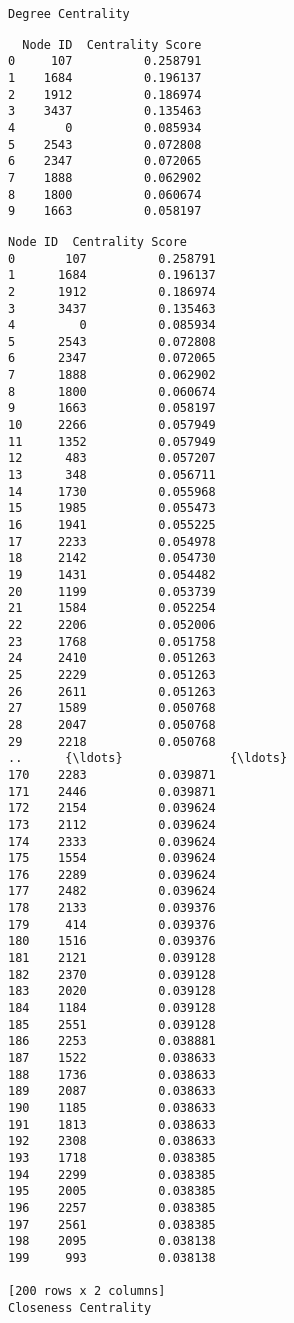 \documentclass[11pt]{article}
\begin{document}
    \begin{Verbatim}[commandchars=\\\{\}]
Degree Centrality

    \end{Verbatim}

    
    \begin{verbatim}
  Node ID  Centrality Score
0     107          0.258791
1    1684          0.196137
2    1912          0.186974
3    3437          0.135463
4       0          0.085934
5    2543          0.072808
6    2347          0.072065
7    1888          0.062902
8    1800          0.060674
9    1663          0.058197
    \end{verbatim}

    
    \begin{Verbatim}[commandchars=\\\{\}]
    Node ID  Centrality Score
0       107          0.258791
1      1684          0.196137
2      1912          0.186974
3      3437          0.135463
4         0          0.085934
5      2543          0.072808
6      2347          0.072065
7      1888          0.062902
8      1800          0.060674
9      1663          0.058197
10     2266          0.057949
11     1352          0.057949
12      483          0.057207
13      348          0.056711
14     1730          0.055968
15     1985          0.055473
16     1941          0.055225
17     2233          0.054978
18     2142          0.054730
19     1431          0.054482
20     1199          0.053739
21     1584          0.052254
22     2206          0.052006
23     1768          0.051758
24     2410          0.051263
25     2229          0.051263
26     2611          0.051263
27     1589          0.050768
28     2047          0.050768
29     2218          0.050768
..      {\ldots}               {\ldots}
170    2283          0.039871
171    2446          0.039871
172    2154          0.039624
173    2112          0.039624
174    2333          0.039624
175    1554          0.039624
176    2289          0.039624
177    2482          0.039624
178    2133          0.039376
179     414          0.039376
180    1516          0.039376
181    2121          0.039128
182    2370          0.039128
183    2020          0.039128
184    1184          0.039128
185    2551          0.039128
186    2253          0.038881
187    1522          0.038633
188    1736          0.038633
189    2087          0.038633
190    1185          0.038633
191    1813          0.038633
192    2308          0.038633
193    1718          0.038385
194    2299          0.038385
195    2005          0.038385
196    2257          0.038385
197    2561          0.038385
198    2095          0.038138
199     993          0.038138

[200 rows x 2 columns]
Closeness Centrality

    \end{Verbatim}
\end{document}

